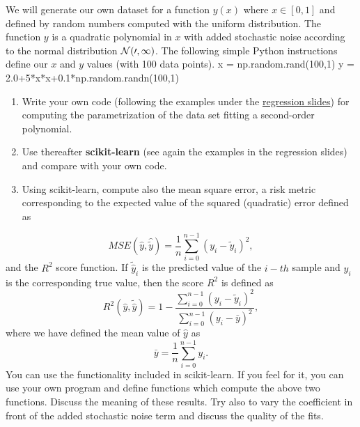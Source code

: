 \documentclass[%
oneside,                 %
final,                   %
10pt]{article}
\newenvironment{doconceexercise}{}{}
\newcounter{doconceexercisecounter}
\begin{document}
\begin{doconceexercise}



We will generate our own dataset for a function $y(x)$ where $x \in [0,1]$ and defined by random numbers computed with the uniform distribution. The function $y$ is a quadratic polynomial in $x$ with added stochastic noise according to the normal distribution $\cal {N}(0,1)$.
The following simple Python instructions define our $x$ and $y$ values (with 100 data points).
\bpycod
x = np.random.rand(100,1)
y = 2.0+5*x*x+0.1*np.random.randn(100,1)
\epycod

\begin{enumerate}
\item Write your own code (following the examples under the \href{{https://compphysics.github.io/MachineLearningECT/doc/pub/Day1/html/Day1-bs.html}}{regression slides}) for computing the parametrization of the data set fitting a second-order polynomial. 

\item Use thereafter \textbf{scikit-learn} (see again the examples in the regression slides) and compare with your own code.   

\item Using scikit-learn, compute also the mean square error, a risk metric corresponding to the expected value of the squared (quadratic) error defined as
\end{enumerate}

\noindent
\[ MSE(\hat{y},\hat{\tilde{y}}) = \frac{1}{n}
\sum_{i=0}^{n-1}(y_i-\tilde{y}_i)^2, 
\] 
and the $R^2$ score function.
If $\tilde{\hat{y}}_i$ is the predicted value of the $i-th$ sample and $y_i$ is the corresponding true value, then the score $R^2$ is defined as
\[
R^2(\hat{y}, \tilde{\hat{y}}) = 1 - \frac{\sum_{i=0}^{n - 1} (y_i - \tilde{y}_i)^2}{\sum_{i=0}^{n - 1} (y_i - \bar{y})^2},
\]
where we have defined the mean value  of $\hat{y}$ as
\[
\bar{y} =  \frac{1}{n} \sum_{i=0}^{n - 1} y_i.
\]
You can use the functionality included in scikit-learn. If you feel for it, you can use your own program and define functions which compute the above two functions. 
Discuss the meaning of these results. Try also to vary the coefficient in front of the added stochastic noise term and discuss the quality of the fits.



\end{doconceexercise}
\end{document}
